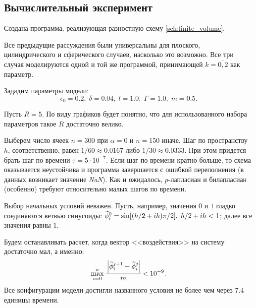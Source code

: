 \subsection{Вычислительный эксперимент}

Создана программа, реализующая разностную схему \eqref{sch:finite_volume}.

Все предыдущие рассуждения были универсальны для плоского, цилиндрического и сферического случаев, насколько это возможно. Все три случая моделируются одной и той же программой, принимающей $k = \overline{0, 2}$ как параметр.

Зададим параметры модели:
\[
    \epsilon_0 = 0.2, \; \delta = 0.04, \; l = 1.0, \; \Gamma = 1.0, \; m = 0.5.
\]

Пусть $R = 5$. По виду графиков будет понятно, что для использованного набора параметров такое $R$ достаточно велико.

Выберем число ячеек $n = 300$ при $\alpha = 0$ и $n = 150$ иначе. Шаг по пространству~$h$, соответственно, равен $1/60 \approx 0.0167$ либо $1/30 \approx 0.0333$. При этом придется брать шаг по времени $\tau = 5 \cdot 10^{-7}$. Если шаг по времени кратно больше, то схема оказывается неустойчива и программа завершается с ошибкой переполнения (в данных возникает значение \emph{NaN}). Как и ожидалось, $p$-лапласиан и билапласиан (особенно) требуют относительно малых шагов по времени.

Выбор начальных условий неважен. Пусть, например, значения $0$ и $1$ гладко соединяются ветвью синусоиды: ${\widetilde{\phi}}_i^0 = \sin[(h/2 + ih) \pi / 2], \; h/2 + ih < 1$; далее все значения равны $1$.

Будем останавливать расчет, когда вектор <<воздействия>> на систему достаточно мал, а именно:
\[
    \max\limits_{i = 0}^n \cfrac{\left| {\widetilde{\phi}}_i^{j + 1} - {\widetilde{\phi}}_i^j \right|}{m} < 10^{-9}.
\]
Все конфигурации модели достигли названного условия не более чем через $7.4$ единицы времени.


